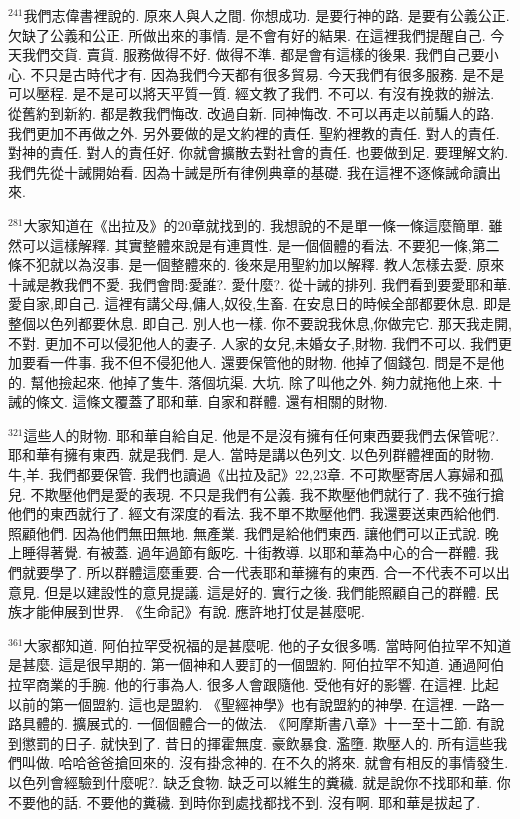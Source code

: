 \documentclass{book}
\begin{document}
$^{241}$我們志偉書裡說的.
原來人與人之間.
你想成功.
是要行神的路.
是要有公義公正.
欠缺了公義和公正.
所做出來的事情.
是不會有好的結果.
在這裡我們提醒自己.
今天我們交貨.
賣貨.
服務做得不好.
做得不準.
都是會有這樣的後果.
我們自己要小心.
不只是古時代才有.
因為我們今天都有很多貿易.
今天我們有很多服務.
是不是可以壓程.
是不是可以將天平質一質.
經文教了我們.
不可以.
有沒有挽救的辦法.
從舊約到新約.
都是教我們悔改.
改過自新.
同神悔改.
不可以再走以前騙人的路.
我們更加不再做之外.
另外要做的是文約裡的責任.
聖約裡教的責任.
對人的責任.
對神的責任.
對人的責任好.
你就會擴散去對社會的責任.
也要做到足.
要理解文約.
我們先從十誡開始看.
因為十誡是所有律例典章的基礎.
我在這裡不逐條誡命讀出來.

$^{281}$大家知道在《出拉及》的20章就找到的.
我想說的不是單一條一條這麼簡單.
雖然可以這樣解釋.
其實整體來說是有連貫性.
是一個個體的看法.
不要犯一條,第二條不犯就以為沒事.
是一個整體來的.
後來是用聖約加以解釋.
教人怎樣去愛.
原來十誡是教我們不愛.
我們會問:愛誰?.
愛什麼?.
從十誡的排列.
我們看到要愛耶和華.
愛自家,即自己.
這裡有講父母,傭人,奴役,生畜.
在安息日的時候全部都要休息.
即是整個以色列都要休息.
即自己.
別人也一樣.
你不要說我休息,你做完它.
那天我走開,不對.
更加不可以侵犯他人的妻子.
人家的女兒,未婚女子,財物.
我們不可以.
我們更加要看一件事.
我不但不侵犯他人.
還要保管他的財物.
他掉了個錢包.
問是不是他的.
幫他撿起來.
他掉了隻牛.
落個坑渠.
大坑.
除了叫他之外.
夠力就拖他上來.
十誡的條文.
這條文覆蓋了耶和華.
自家和群體.
還有相關的財物.

$^{321}$這些人的財物.
耶和華自給自足.
他是不是沒有擁有任何東西要我們去保管呢?.
耶和華有擁有東西.
就是我們.
是人.
當時是講以色列文.
以色列群體裡面的財物.
牛,羊.
我們都要保管.
我們也讀過《出拉及記》22,23章.
不可欺壓寄居人寡婦和孤兒.
不欺壓他們是愛的表現.
不只是我們有公義.
我不欺壓他們就行了.
我不強行搶他們的東西就行了.
經文有深度的看法.
我不單不欺壓他們.
我還要送東西給他們.
照顧他們.
因為他們無田無地.
無產業.
我們是給他們東西.
讓他們可以正式說.
晚上睡得著覺.
有被蓋.
過年過節有飯吃.
十街教導.
以耶和華為中心的合一群體.
我們就要學了.
所以群體這麼重要.
合一代表耶和華擁有的東西.
合一不代表不可以出意見.
但是以建設性的意見提議.
這是好的.
實行之後.
我們能照顧自己的群體.
民族才能伸展到世界.
《生命記》有說.
應許地打仗是甚麼呢.

$^{361}$大家都知道.
阿伯拉罕受祝福的是甚麼呢.
他的子女很多嗎.
當時阿伯拉罕不知道是甚麼.
這是很早期的.
第一個神和人要訂的一個盟約.
阿伯拉罕不知道.
通過阿伯拉罕商業的手腕.
他的行事為人.
很多人會跟隨他.
受他有好的影響.
在這裡.
比起以前的第一個盟約.
這也是盟約.
《聖經神學》也有說盟約的神學.
在這裡.
一路一路具體的.
擴展式的.
一個個體合一的做法.
《阿摩斯書八章》十一至十二節.
有說到懲罰的日子.
就快到了.
昔日的揮霍無度.
豪飲暴食.
濫墮.
欺壓人的.
所有這些我們叫做.
哈哈爸爸搶回來的.
沒有掛念神的.
在不久的將來.
就會有相反的事情發生.
以色列會經驗到什麼呢?.
缺乏食物.
缺乏可以維生的糞穢.
就是說你不找耶和華.
你不要他的話.
不要他的糞穢.
到時你到處找都找不到.
沒有啊.
耶和華是拔起了.
\end{document}
